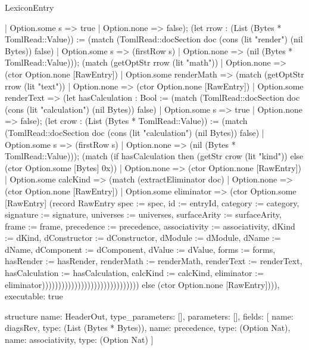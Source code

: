 \begin{lexlean}{LexiconEntry}
\begin{semanticmodule}
{                              | Option.some s => true
                              | Option.none => false); (let rrow : (List (Bytes * TomlRead::Value)) := (match (TomlRead::docSection doc (cons (lit "render") (nil Bytes)) false)
                              | Option.some s => (firstRow s)
                              | Option.none => (nil (Bytes * TomlRead::Value))); (match (getOptStr rrow (lit "math"))
                              | Option.none => (ctor Option.none [RawEntry])
                              | Option.some renderMath => (match (getOptStr rrow (lit "text"))
                                | Option.none => (ctor Option.none [RawEntry])
                                | Option.some renderText => (let hasCalculation : Bool := (match (TomlRead::docSection doc (cons (lit "calculation") (nil Bytes)) false)
                                  | Option.some s => true
                                  | Option.none => false); (let crow : (List (Bytes * TomlRead::Value)) := (match (TomlRead::docSection doc (cons (lit "calculation") (nil Bytes)) false)
                                  | Option.some s => (firstRow s)
                                  | Option.none => (nil (Bytes * TomlRead::Value))); (match (if hasCalculation then (getStr crow (lit "kind")) else (ctor Option.some [Bytes] 0x))
                                  | Option.none => (ctor Option.none [RawEntry])
                                  | Option.some calcKind => (match (extractEliminator doc)
                                    | Option.none => (ctor Option.none [RawEntry])
                                    | Option.some eliminator => (ctor Option.some [RawEntry] (record RawEntry {spec := spec, id := entryId, category := category, signature := signature, universes := universes, surfaceArity := surfaceArity, frame := frame, precedence := precedence, associativity := associativity, dKind := dKind, dConstructor := dConstructor, dModule := dModule, dName := dName, dComponent := dComponent, dValue := dValue, forms := forms, hasRender := hasRender, renderMath := renderMath, renderText := renderText, hasCalculation := hasCalculation, calcKind := calcKind, eliminator := eliminator})))))))))))))))))))))))))))))) else (ctor Option.none [RawEntry]))),
  executable: true
}

structure{
  name: HeaderOut,
  type_parameters: [],
  parameters: [],
  fields: [
    {name: diagsRev, type: (List (Bytes * Bytes))},
    {name: precedence, type: (Option Nat)},
    {name: associativity, type: (Option Nat)}
  ]
}


\end{semanticmodule}
\end{lexlean}
